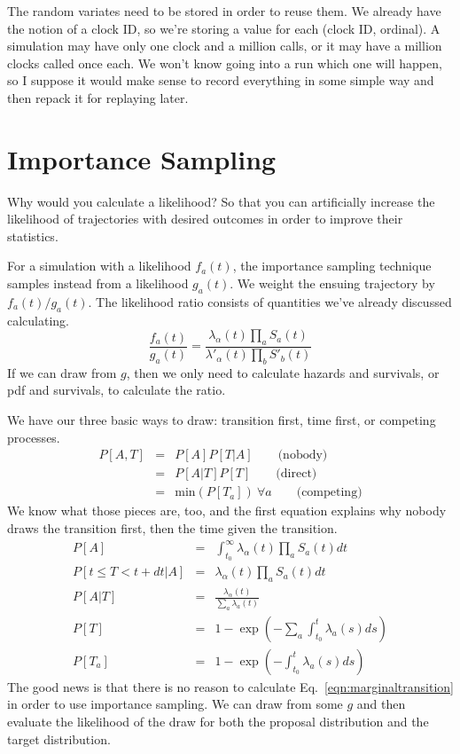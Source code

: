\documentclass{article}
\begin{document}
The random variates need to be stored in order to reuse them. We already have the notion of a clock ID, so we're storing a value for each (clock ID, ordinal). A simulation may have only one clock and a million calls, or it may have a million clocks called once each. We won't know going into a run which one will happen, so I suppose it would make sense to record everything in some simple way and then repack it for replaying later.


\section{Importance Sampling}

Why would you calculate a likelihood? So that you can artificially increase the likelihood of trajectories with desired outcomes in order to improve their statistics.

For a simulation with a likelihood $f_a(t)$, the importance sampling technique samples instead from a likelihood $g_a(t)$. We weight the ensuing trajectory by $f_a(t)/g_a(t)$. The likelihood ratio consists of quantities we've already discussed calculating.
\begin{equation}
	\frac{f_a(t)}{g_a(t)} = \frac{\lambda_{\alpha}(t)\prod_{a}S_a(t)}{\lambda'_{\alpha}(t)\prod_{b}S'_b(t)}\label{eqn:likelihoodratio}
\end{equation}
If we can draw from $g$, then we only need to calculate hazards and survivals, or pdf and survivals, to calculate the ratio.

We have our three basic ways to draw: transition first, time first, or competing processes.
\begin{eqnarray}
	P[A,T]&=&P[A]P[T|A]\qquad\mbox{(nobody)} \\
	&=&P[A|T]P[T]\qquad\mbox{(direct)}\\
	&=&\mbox{min}(P[T_a])\ \forall a\qquad\mbox{(competing)}
\end{eqnarray}
We know what those pieces are, too, and the first equation explains why nobody draws the transition first, then the time given the transition.
\begin{eqnarray}
	P[A] & = & \int_{t_0}^\infty \lambda_{\alpha}(t)\prod_{a}S_a(t)dt\label{eqn:marginaltransition} \\
	P[t\le T<t+dt|A] & = & \lambda_{\alpha}(t)\prod_{a}S_a(t)dt \\
	P[A|T] & = & \frac{\lambda_\alpha(t)}{\sum_a\lambda_a(t)} \\
	P[T] & = & 1-\exp(-\sum_a\int_{t_0}^t\lambda_a(s)ds) \\
	P[T_a] & = & 1-\exp(-\int_{t_0}^t \lambda_a(s)ds)
\end{eqnarray}
The good news is that there is no reason to calculate Eq.~\ref{eqn:marginaltransition} in order to use importance sampling. We can draw from some $g$ and then evaluate the likelihood of the draw for both the proposal distribution and the target distribution.
\end{document}
